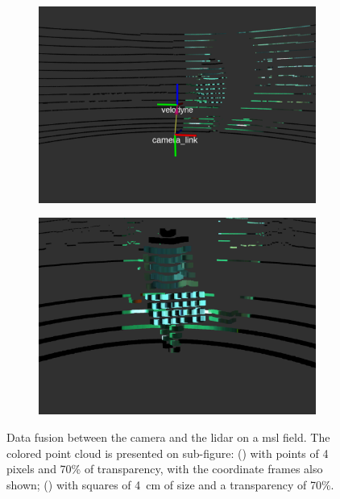 \begin{figure}[!ht]
	\centering
	\begin{subfigure}[t]{0.45\textwidth}
		\includegraphics[width=\textwidth]{img/sensor_fusion/cambada_fusion_points.png}
		\caption{}
		\label{fig:sensor-fusion:cambada-points}
	\end{subfigure}
	\qquad
	\begin{subfigure}[t]{0.45\textwidth}
		\includegraphics[width=\textwidth]{img/sensor_fusion/cambada_fusion_squares.png}
	\caption{}%
		\label{fig:sensor-fusion:cambada-squares}
	\end{subfigure}
	\caption[Colored point clouds computed for the datasets on \acs{irislab}.]{Data fusion between the camera and the \ac{lidar} on a \ac{msl} field. The colored point cloud is presented on sub-figure: () with points of 4 pixels and 70\% of transparency, with the coordinate frames also shown; () with squares of \SI{4}{\centi\meter} of size and a transparency of 70\%.}
	\label{fig:cambada-sensor-fusion}
\end{figure}

